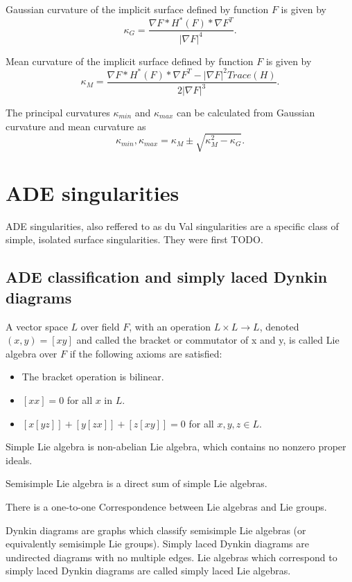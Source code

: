 Gaussian curvature of the implicit surface defined by function $F$ is given by 
$$\kappa_G = \frac{\nabla F * H^*(F) * \nabla F^T}{|\nabla F|^4}.$$

Mean curvature of the implicit surface defined by function $F$ is given by 
$$\kappa_M = \frac{\nabla F * H^*(F) * \nabla F^T - | \nabla F |^2 Trace(H)}{2|\nabla F|^3}.$$

The principal curvatures $\kappa_{min}$ and $\kappa_{max}$ can be calculated from Gaussian curvature and
mean curvature as 
$$\kappa_{min}, \kappa_{max} = \kappa_M \pm \sqrt{\kappa_M^2-\kappa_G}.$$

\section{ADE singularities}
\label{sub2.2}

ADE singularities, also reffered to as du Val singularities are a specific
class of simple, isolated surface singularities. They were first TODO.

\subsection*{ADE classification and simply laced Dynkin diagrams}
\label{subs2.2.1}

\begin{definition} \cite{humphreys2012introduction}
    A vector space $L$ over field $F$, with an operation $L \times L \to L$,
    denoted $(x, y) = [xy]$ and called the bracket or commutator of x and y,
    is called Lie algebra over $F$ if the following axioms are satisfied:
    \begin{itemize}
        \item The bracket operation is bilinear.
        \item $[xx] = 0$ for all $x$ in $L$.
        \item $[x[yz]]+[y[zx]]+[z[xy]] = 0$ for all $x, y, z \in L$.
    \end{itemize}

    Simple Lie algebra is non-abelian Lie algebra, which contains no
    nonzero proper ideals.

    Semisimple Lie algebra is a direct sum of simple Lie algebras.
\end{definition}

There is a one-to-one Correspondence between Lie algebras and Lie groups.

Dynkin diagrams are graphs which classify semisimple Lie algebras (or
equivalently semisimple Lie groups).
Simply laced Dynkin diagrams are undirected diagrams with
no multiple edges. Lie algebras which correspond to simply laced
Dynkin diagrams are called simply laced Lie algebras.

